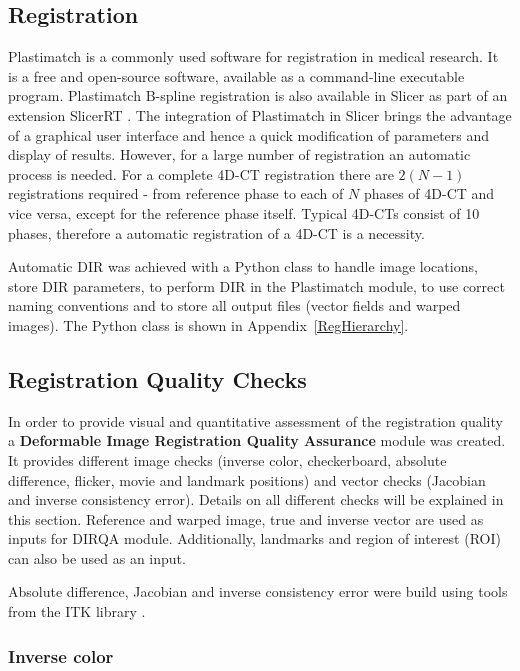 \subsection{Registration}
\label{RegistrationImplement}

Plastimatch \cite{Shackleford2010} is a commonly used software for registration in medical research. It is a free and open-source software, available as a command-line executable program. 
Plastimatch B-spline registration is also available in Slicer as part of an extension SlicerRT \cite{Pinter2012}.
The integration of Plastimatch in Slicer brings the advantage of a graphical user interface and hence a quick modification of parameters and display of results. 
However, for a large number of registration an automatic process is needed. For a complete 4D-CT registration there are $2(N-1)$ registrations required - from reference phase to each of $N$ phases of 4D-CT and vice versa, except for the reference phase itself. 
Typical 4D-CTs consist of 10 phases, therefore a automatic registration of a 4D-CT is a necessity.

Automatic DIR was achieved with a Python class to handle image locations, store DIR parameters, to perform DIR in the Plastimatch module, to use correct naming conventions and to store all output files (vector fields and warped images). 
The Python class is shown in Appendix~\ref{RegHierarchy}.


\subsection{Registration Quality Checks}
\label{DIRQA}

In order to provide visual and quantitative assessment of the registration quality a \textbf{Deformable Image Registration Quality Assurance} module was created. It provides different image checks (inverse color, checkerboard, absolute difference, flicker, movie and landmark positions) and vector checks (Jacobian and inverse consistency error). Details on all different checks will be explained in this section. Reference and warped image, true and inverse vector are used as inputs for DIRQA module. Additionally, landmarks and region of interest (ROI) can also be used as an input.

Absolute difference, Jacobian and inverse consistency error were build using tools from the ITK library \cite{Yoo2002}.

\subsubsection{Inverse color}
\label{Sec:FalseColor}

